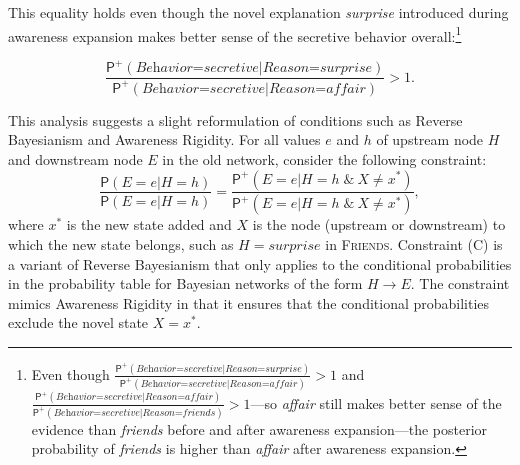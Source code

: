 \documentclass[
  11pt,
  dvipsnames,enabledeprecatedfontcommands]{scrartcl}
\newcommand{\pr}[1]{\ensuremath{\mathsf{P}(#1)}}
\newcommand{\ppr}[2]{\ensuremath{\mathsf{P}^{#1}(#2)}}
\begin{document}
\noindent This equality holds even though the novel explanation
\textit{surprise} introduced during awareness expansion makes better
sense of the secretive behavior overall:\footnote{Even though
  \(\frac{\ppr{+}{\textit{Behavior=secretive} \vert \textit{Reason=surprise}}}{\ppr{+}{\textit{Behavior=secretive} \vert \textit{Reason=affair}}}>1\)
  and
  \(\frac{\ppr{+}{\textit{Behavior=secretive} \vert \textit{Reason=affair}}}{\ppr{+}{\textit{Behavior=secretive} \vert \textit{Reason=friends}}}>1\)---so
  \textit{affair} still makes better sense of the evidence than
  \textit{friends} before and after awareness expansion---the posterior
  probability of \textit{friends} is higher than \textit{affair} after
  awareness expansion.}

\[\frac{\ppr{+}{\textit{Behavior=secretive} \vert \textit{Reason=surprise}}}{\ppr{+}{\textit{Behavior=secretive} \vert \textit{Reason=affair}}}>1. \]

This analysis suggests a slight reformulation of conditions such as
Reverse Bayesianism and Awareness Rigidity. For all values \(e\) and
\(h\) of upstream node \(H\) and downstream node \(E\) in the old
network, consider the following constraint:
\[\frac{\pr{E=e \vert H=h}}{\pr{E=e \vert H=h}} = \frac{\ppr{+}{E=e \vert H=h  \; \& \: X\neq x^*}}{\ppr{+}{E=e \vert H=h  \; \& \: X\neq x^*}}, \tag{C}\]
where \(x^*\) is the new state added and \(X\) is the node (upstream or
downstream) to which the new state belongs, such as
\(H=\textit{surprise}\) in \textsc{Friends}. Constraint (C) is a variant
of Reverse Bayesianism that only applies to the conditional
probabilities in the probability table for Bayesian networks of the form
\(H \rightarrow E\). The constraint mimics Awareness Rigidity in that it
ensures that the conditional probabilities exclude the novel state
\(X=x^*\).
\end{document}
